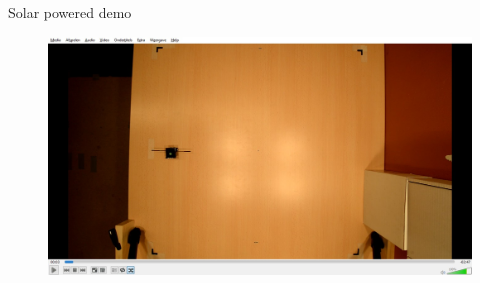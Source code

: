 \documentclass{beamer}
\begin{document}
\begin{frame}{Solar powered demo}
	\begin{figure}
		\centering
		\includegraphics[width=\textwidth]{pics/video.jpg}
	\end{figure}
\end{frame}
\end{document}
